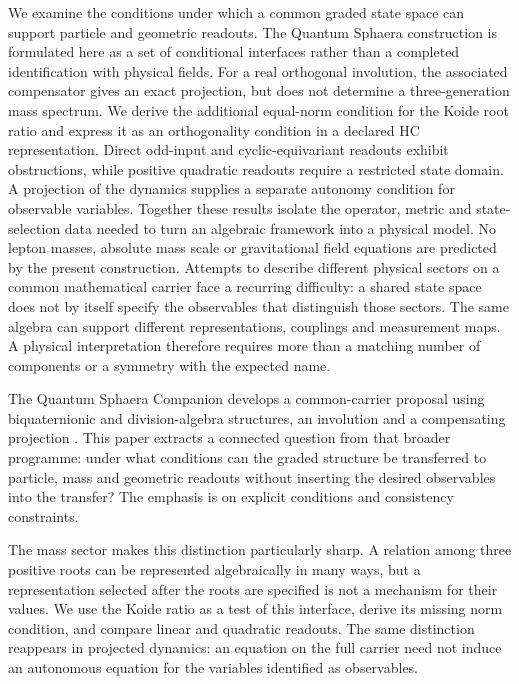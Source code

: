 We examine the conditions under which a common graded state space can
support particle and geometric readouts. The Quantum Sphaera construction
is formulated here as a set of conditional interfaces rather than a
completed identification with physical fields. For a real orthogonal
involution, the associated compensator gives an exact projection, but
does not determine a three-generation mass spectrum. We derive the
additional equal-norm condition for the Koide root ratio and express it
as an orthogonality condition in a declared HC representation. Direct
odd-input and cyclic-equivariant readouts exhibit obstructions, while
positive quadratic readouts require a restricted state domain. A
projection of the dynamics supplies a separate autonomy condition for
observable variables. Together these results isolate the operator,
metric and state-selection data needed to turn an algebraic framework
into a physical model. No lepton masses, absolute mass scale or
gravitational field equations are predicted by the present construction.
Attempts to describe different physical sectors on a common mathematical
carrier face a recurring difficulty: a shared state space does not by
itself specify the observables that distinguish those sectors. The same
algebra can support different representations, couplings and measurement
maps. A physical interpretation therefore requires more than a matching
number of components or a symmetry with the expected name.

The Quantum Sphaera Companion develops a common-carrier proposal using
biquaternionic and division-algebra structures, an involution and a
compensating projection \cite{QSC411}. This paper extracts a connected
question from that broader programme: under what conditions can the
graded structure be transferred to particle, mass and geometric
readouts without inserting the desired observables into the transfer?
The emphasis is on explicit conditions and consistency constraints.

The mass sector makes this distinction particularly sharp. A relation
among three positive roots can be represented algebraically in many ways,
but a representation selected after the roots are specified is not a
mechanism for their values. We use the Koide ratio as a test of this
interface, derive its missing norm condition, and compare linear and
quadratic readouts. The same distinction reappears in projected dynamics:
an equation on the full carrier need not induce an autonomous equation
for the variables identified as observables.

